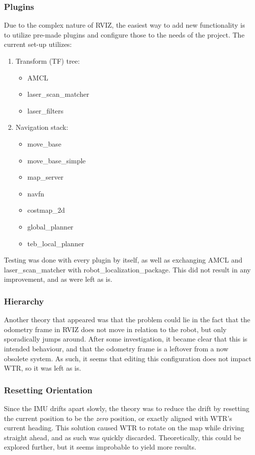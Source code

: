 \subsubsection{Plugins} 
\label{subs::plugins}
Due to the complex nature of RVIZ, the easiest way to add new functionality is to utilize pre-made plugins and configure those to the needs of the project.
The current set-up utilizes:
\begin{enumerate}
\item Transform (TF) tree:
    \begin{itemize}
    \item AMCL
    \item laser\_scan\_matcher
    \item laser\_filters
\end{itemize}
\item Navigation stack:
\begin{itemize}
\item move\_base
\item move\_base\_simple
\item map\_server
\item navfn
\item costmap\_2d
\item global\_planner
\item teb\_local\_planner
\end{itemize}
\end{enumerate}
Testing was done with every plugin by itself, as well as exchanging AMCL and laser\_scan\_matcher with robot\_localization\_package.
This did not result in any improvement, and as were left as is.

\subsubsection{Hierarchy}
\label{subs::hier}
Another theory that appeared was that the problem could lie in the fact that the odometry frame in RVIZ does not move in relation to the robot, but only sporadically jumps around.
After some investigation, it became clear that this is intended behaviour, and that the odometry frame is a leftover from a now obsolete system.
As such, it seems that editing this configuration does not impact WTR, so it was left as is.

\subsubsection{Resetting Orientation}
\label{subs::reset}
Since the IMU drifts apart slowly, the theory was to reduce the drift by resetting the current position to be the \textit{zero} position, or exactly aligned with WTR's current heading.
This solution caused WTR to rotate on the map while driving straight ahead, and as such was quickly discarded.
Theoretically, this could be explored further, but it seems improbable to yield more results.

